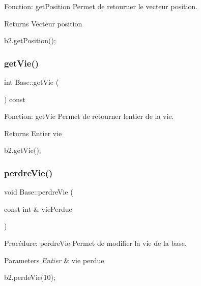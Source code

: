 Fonction\+: get\+Position Permet de retourner le vecteur position. 

\begin{DoxyReturn}{Returns}
Vecteur position 
\begin{DoxyCode}
b2.getPosition();
\end{DoxyCode}
 
\end{DoxyReturn}
\mbox{\label{classBase_ac5eaf0382ca793fe38997c53480fb056}} 
\subsubsection{\texorpdfstring{get\+Vie()}{getVie()}}
{\footnotesize\ttfamily int Base\+::get\+Vie (\begin{DoxyParamCaption}{ }\end{DoxyParamCaption}) const}



Fonction\+: get\+Vie Permet de retourner l\textquotesingle{}entier de la vie. 

\begin{DoxyReturn}{Returns}
Entier vie 
\begin{DoxyCode}
b2.getVie();
\end{DoxyCode}
 
\end{DoxyReturn}
\mbox{\label{classBase_a0471688678ab6e2aba5ee69d290c2e20}} 
\subsubsection{\texorpdfstring{perdre\+Vie()}{perdreVie()}}
{\footnotesize\ttfamily void Base\+::perdre\+Vie (\begin{DoxyParamCaption}\item[{const int \&}]{vie\+Perdue }\end{DoxyParamCaption})}



Procédure\+: perdre\+Vie Permet de modifier la vie de la base. 


\begin{DoxyParams}{Parameters}
{\em Entier} & vie perdue 
\begin{DoxyCode}
b2.perdeVie(10);
\end{DoxyCode}
 \\
\hline
\end{DoxyParams}
\mbox{\label{classBase_afe9eb29bdaf866dc20af0b833209e29e}} 
